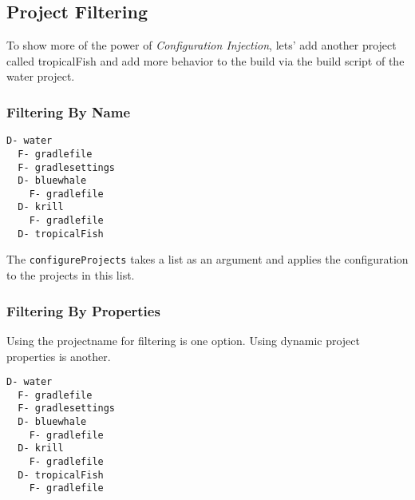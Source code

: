 \subsection{Project Filtering} %
\label{sub:project_filtering}
To show more of the power of \emph{Configuration Injection}, lets' add another project called tropicalFish and add more behavior to the build via the build script of the water project.

\subsubsection{Filtering By Name} %
\label{ssub:filtering_by_name}
\begin{minipage}[t]{7cm}
\begin{Verbatim}[frame=single,label=Project Tree]
D- water
  F- gradlefile
  F- gradlesettings
  D- bluewhale
    F- gradlefile
  D- krill
    F- gradlefile
  D- tropicalFish	
\end{Verbatim}
\end{minipage}	
\begin{minipage}[t]{9cm}
\end{minipage}

The \texttt{configureProjects} takes a list as an argument and applies the configuration to the projects in this list.

\subsubsection{Filtering By Properties} %
\label{ssub:filtering_by_properties}

Using the projectname for filtering is one option. Using dynamic project properties is another.
\\

\begin{minipage}[t]{7cm}
\begin{Verbatim}[frame=single,label=Project Tree]
D- water
  F- gradlefile
  F- gradlesettings
  D- bluewhale
    F- gradlefile
  D- krill
    F- gradlefile
  D- tropicalFish
    F- gradlefile	
\end{Verbatim}
\end{minipage}	
\begin{minipage}[t]{9cm}
\end{minipage}

